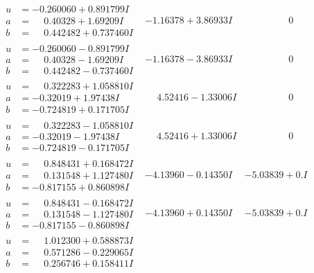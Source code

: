\documentclass[1p]{elsarticle_modified}
\theoremstyle{definition}
\begin{document}
$$\begin{array}{c|c|c}
\begin{aligned}
u &= -0.260060 + 0.891799 I \\
a &= \phantom{-}0.40328 + 1.69209 I \\
b &= \phantom{-}0.442482 + 0.737460 I\end{aligned}
 & -1.16378 + 3.86933 I & \phantom{-0.000000 } 0 \\ \hline\begin{aligned}
u &= -0.260060 - 0.891799 I \\
a &= \phantom{-}0.40328 - 1.69209 I \\
b &= \phantom{-}0.442482 - 0.737460 I\end{aligned}
 & -1.16378 - 3.86933 I & \phantom{-0.000000 } 0 \\ \hline\begin{aligned}
u &= \phantom{-}0.322283 + 1.058810 I \\
a &= -0.32019 + 1.97438 I \\
b &= -0.724819 + 0.171705 I\end{aligned}
 & \phantom{-}4.52416 - 1.33006 I & \phantom{-0.000000 } 0 \\ \hline\begin{aligned}
u &= \phantom{-}0.322283 - 1.058810 I \\
a &= -0.32019 - 1.97438 I \\
b &= -0.724819 - 0.171705 I\end{aligned}
 & \phantom{-}4.52416 + 1.33006 I & \phantom{-0.000000 } 0 \\ \hline\begin{aligned}
u &= \phantom{-}0.848431 + 0.168472 I \\
a &= \phantom{-}0.131548 + 1.127480 I \\
b &= -0.817155 + 0.860898 I\end{aligned}
 & -4.13960 - 0.14350 I & -5.03839 + 0. I\phantom{ +0.000000I} \\ \hline\begin{aligned}
u &= \phantom{-}0.848431 - 0.168472 I \\
a &= \phantom{-}0.131548 - 1.127480 I \\
b &= -0.817155 - 0.860898 I\end{aligned}
 & -4.13960 + 0.14350 I & -5.03839 + 0. I\phantom{ +0.000000I} \\ \hline\begin{aligned}
u &= \phantom{-}1.012300 + 0.588873 I \\
a &= \phantom{-}0.571286 - 0.229065 I \\
b &= \phantom{-}0.256746 + 0.158411 I\end{aligned}

\end{array}$$
\end{document}

